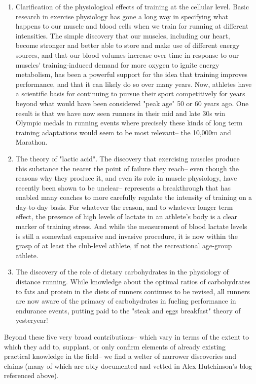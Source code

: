 \begin{enumerate}
    \item Clarification of the physiological effects of training at the cellular level. Basic research in exercise physiology has gone a long way in specifying what happens to our muscle and blood cells when we train for running at different intensities. The simple discovery that our muscles, including our heart, become stronger and better able to store and make use of different energy sources, and that our blood volumes increase over time in response to our muscles' training-induced demand for more oxygen to ignite energy metabolism, has been a powerful support for the idea that training improves performance, and that it can likely do so over many years. Now, athletes have a scientific basis for continuing to pursue their sport competitively for years beyond what would have been considered "peak age" 50 or 60 years ago. One result is that we have now seen runners in their mid and late 30s win Olympic medals in running events where precisely these kinds of long term training adaptations would seem to be most relevant-- the 10,000m and Marathon.
        
    \item The theory of "lactic acid". The discovery that exercising muscles produce this substance the nearer the point of failure they reach-- even though the reasons why they produce it, and even its role in muscle physiology, have recently been shown to be unclear-- represents a breakthrough that has enabled many coaches to more carefully regulate the intensity of training on a day-to-day basis. For whatever the reason, and to whatever longer term effect, the presence of high levels of lactate in an athlete's body is a clear marker of training stress. And while the measurement of blood lactate levels is still a somewhat expensive and invasive procedure, it is now within the grasp of at least the club-level athlete, if not the recreational age-group athlete.
        
    \item The discovery of the role of dietary carbohydrates in the physiology of distance running. While knowledge about the optimal ratios of carbohydrates to fats and protein in the diets of runners continues to be revised, all runners are now aware of the primacy of carbohydrates in fueling performance in endurance events, putting paid to the "steak and eggs breakfast" theory of yesteryear!
\end{enumerate}

Beyond these five very broad contributions-- which vary in terms of the extent to which they add to, supplant, or only confirm elements of already existing practical knowledge in the field-- we find a welter of narrower discoveries and claims (many of which are ably documented and vetted in Alex Hutchinson's blog referenced above).

